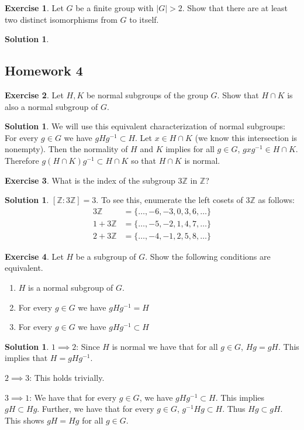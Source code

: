 \documentclass[12pt]{article}
\theoremstyle{definition}
\newtheorem{exercise}{Exercise}
\theoremstyle{definition}
\newtheorem{solution}[theorem]{Solution}
\newcommand{\Z}{\mathbb{Z}}
\begin{document}
\begin{exercise}
Let $G$ be a finite group with $|G| > 2$. Show that there are at least two distinct isomorphisms from $G$ to itself. 
\end{exercise}
\begin{solution}

\end{solution}

\subsection{Homework 4}

\begin{exercise}
Let $H, K$ be normal subgroups of the group $G$. Show that $H \cap K$ is also a normal subgroup of $G$.
\end{exercise}
\begin{solution}
We will use this equivalent characterization of normal subgroups: For every $g \in G$ we have $gHg^{-1} \subset H$. Let $x \in H \cap K$ (we know this intersection is nonempty). Then the normality of $H$ and $K$ implies for all $g \in G$, $gxg^{-1} \in H \cap K$. Therefore $g (H \cap K) g^{-1} \subset H \cap K$ so that $H \cap K$ is normal.
\end{solution}

\begin{exercise}
What is the index of the subgroup $3 \Z$ in $\Z$?
\end{exercise}
\begin{solution}
$[\Z : 3 \Z] = 3$. To see this, enumerate the left cosets of $3\Z$ as follows:
\begin{align*}
3 \Z &= \{ \ldots, -6, -3, 0, 3, 6, \ldots \} \\
1 + 3 \Z &= \{ \ldots, -5, -2, 1, 4, 7, \ldots \} \\
2 + 3 \Z &= \{ \ldots, -4, -1, 2, 5, 8, \ldots \}
\end{align*}
\end{solution}

\begin{exercise}
Let $H$ be a subgroup of $G$. Show the following conditions are equivalent.
\begin{enumerate}
	\item $H$ is a normal subgroup of $G$.
	\item For every $g \in G$ we have $gHg^{-1} = H$
	\item For every $g \in G$ we have $gHg^{-1} \subset H$
\end{enumerate}
\end{exercise}
\begin{solution} 
$1 \implies 2$: Since $H$ is normal we have that for all $g \in G$, $Hg = gH$. This implies that $H = gH g^{-1}$.

$2 \implies 3$: This holds trivially.

$3 \implies 1$: We have that for every $g \in G$, we have $gHg^{-1} \subset H$. This implies $gH \subset Hg$. Further, we have that for every $g \in G$, $g^{-1}Hg \subset H$. Thus $Hg \subset gH$. This shows $gH = Hg$ for all $g \in G$. 
\end{solution}
\end{document}
